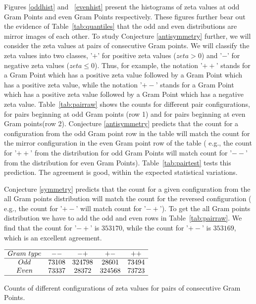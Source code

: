 \documentclass[twoside]{article}
\begin{document}
Figures \ref{oddhist} and ~\ref{evenhist}  present the histograms of zeta values at odd Gram Points and even Gram Points respectively. These figures further bear out the evidence of Table~\ref{tab:quantiles} that the odd and even distributions are mirror images of each other. To study Conjecture \ref{antisymmetry} further, we will consider the zeta values at pairs of consecutive Gram points. We will classify the zeta values into two classes, '$+$' for positive zeta values ($zeta > 0$) and '$-$' for negative zeta values ($zeta \leqslant  0$). Thus, for example, the notation '$++$' stands for a Gram Point which has a positive zeta value followed by a Gram Point which has a positive zeta value, while the notation '$+-$' stands for a Gram Point which has a positive zeta value followed by a Gram Point which has a negative zeta value. Table~\ref{tab:pairraw} shows the counts for different pair configurations, for pairs beginning at odd Gram points (row 1) and for pairs beginning at even Gram points(row 2). Conjecture \ref{antisymmetry} predicts that the count for a configuration from the odd Gram point row in the table  will match the count for the mirror configuration in the even Gram point row of the table ( e.g., the count for '$++$' from the distribution for odd Gram Points will match count for '$--$' from the distribution for even Gram Points). Table~\ref{tab:pairtest} tests this prediction. The agreement is good, within the expected statistical variations. 

Conjecture \ref{symmetry} predicts that the count for a given configuration from the all Gram points distribution  will match the count for the reversed configuration ( e.g., the count for '$+-$' will match count for '$-+$'). To get the all Gram points distribution we have to add the odd and even rows in Table~\ref{tab:pairraw}. We find that the count for '$-+$' is $353170$, while the count for '$+-$' is $353169$, which is an excellent agreement.

\begin{table}
\centering \(\begin{array}{ccccc}
\hline
 Gram~type&   --   & -+   & +-   & ++  \\
\hline
Odd&  73108& 324798& 28601& 73494 \\
Even&  73337& 28372& 324568& 73723 \\
\hline
\end{array}\)
\caption{Counts of different configurations of zeta values for pairs of consecutive Gram Points.} \label{tab:pairraw}
\end{table}
\end{document}

